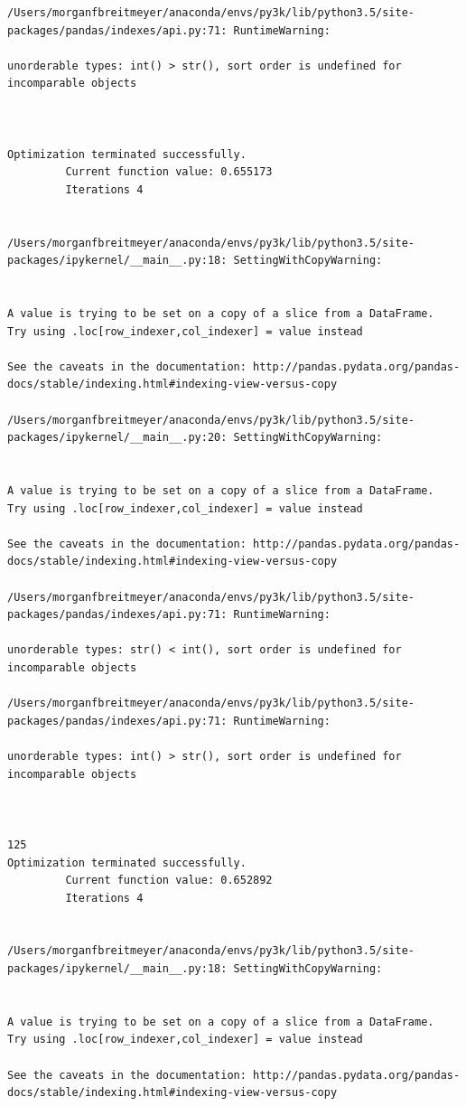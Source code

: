 \begin{lstlisting}
/Users/morganfbreitmeyer/anaconda/envs/py3k/lib/python3.5/site-packages/pandas/indexes/api.py:71: RuntimeWarning:

unorderable types: int() > str(), sort order is undefined for incomparable objects



Optimization terminated successfully.
         Current function value: 0.655173
         Iterations 4


/Users/morganfbreitmeyer/anaconda/envs/py3k/lib/python3.5/site-packages/ipykernel/__main__.py:18: SettingWithCopyWarning:


A value is trying to be set on a copy of a slice from a DataFrame.
Try using .loc[row_indexer,col_indexer] = value instead

See the caveats in the documentation: http://pandas.pydata.org/pandas-docs/stable/indexing.html#indexing-view-versus-copy

/Users/morganfbreitmeyer/anaconda/envs/py3k/lib/python3.5/site-packages/ipykernel/__main__.py:20: SettingWithCopyWarning:


A value is trying to be set on a copy of a slice from a DataFrame.
Try using .loc[row_indexer,col_indexer] = value instead

See the caveats in the documentation: http://pandas.pydata.org/pandas-docs/stable/indexing.html#indexing-view-versus-copy

/Users/morganfbreitmeyer/anaconda/envs/py3k/lib/python3.5/site-packages/pandas/indexes/api.py:71: RuntimeWarning:

unorderable types: str() < int(), sort order is undefined for incomparable objects

/Users/morganfbreitmeyer/anaconda/envs/py3k/lib/python3.5/site-packages/pandas/indexes/api.py:71: RuntimeWarning:

unorderable types: int() > str(), sort order is undefined for incomparable objects



125
Optimization terminated successfully.
         Current function value: 0.652892
         Iterations 4


/Users/morganfbreitmeyer/anaconda/envs/py3k/lib/python3.5/site-packages/ipykernel/__main__.py:18: SettingWithCopyWarning:


A value is trying to be set on a copy of a slice from a DataFrame.
Try using .loc[row_indexer,col_indexer] = value instead

See the caveats in the documentation: http://pandas.pydata.org/pandas-docs/stable/indexing.html#indexing-view-versus-copy


\end{lstlisting}
